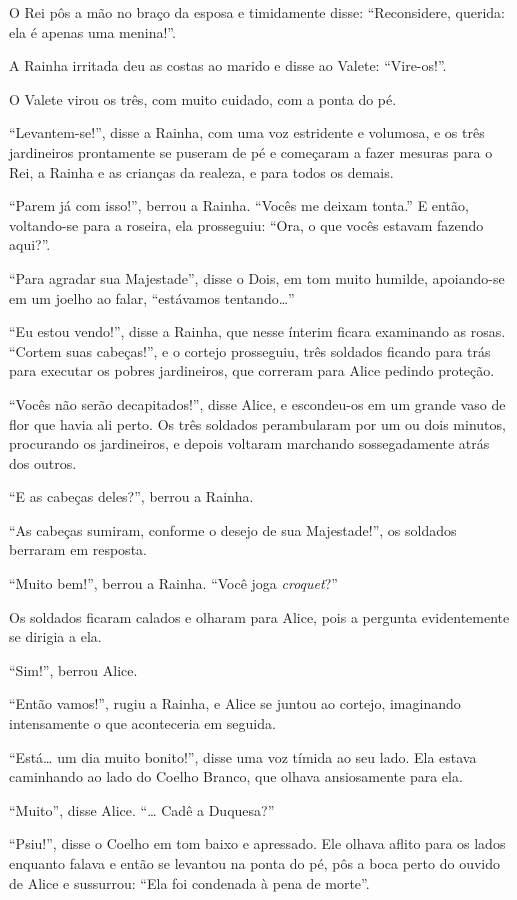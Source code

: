 O Rei pôs a mão no braço da esposa e timidamente disse: ``Reconsidere,
querida: ela é apenas uma menina!''.

A Rainha irritada deu as costas ao marido e disse ao Valete:
``Vire-os!''.

O Valete virou os três, com muito cuidado, com a ponta do pé.

``Levantem-se!'', disse a Rainha, com uma voz estridente e volumosa, e
os três jardineiros prontamente se puseram de pé e começaram a fazer
mesuras para o Rei, a Rainha e as crianças da realeza, e para
todos os demais.

``Parem já com isso!'', berrou a Rainha. ``Vocês me deixam tonta.'' E
então, voltando-se para a roseira, ela prosseguiu: ``Ora, o que vocês
estavam fazendo aqui?''.

``Para agradar sua Majestade'', disse o Dois, em tom muito humilde,
apoiando-se em um joelho ao falar, ``estávamos tentando\ldots{}''

``Eu estou vendo!'', disse a Rainha, que nesse ínterim ficara examinando
as rosas. ``Cortem suas cabeças!'', e o cortejo prosseguiu, três
soldados ficando para trás para executar os pobres jardineiros, que
correram para Alice pedindo proteção.

``Vocês não serão decapitados!'', disse Alice, e escondeu-os em um
grande vaso de flor que havia ali perto. Os três soldados perambularam
por um ou dois minutos, procurando os jardineiros, e depois voltaram
marchando sossegadamente atrás dos outros.

``E as cabeças deles?'', berrou a Rainha.

``As cabeças sumiram, conforme o desejo de sua Majestade!'', os soldados
berraram em resposta.

``Muito bem!'', berrou a Rainha. ``Você joga \textit{croquet}?''

Os soldados ficaram calados e olharam para Alice, pois a pergunta
evidentemente se dirigia a ela.

``Sim!'', berrou Alice.

``Então vamos!'', rugiu a Rainha, e Alice se juntou ao cortejo,
imaginando intensamente o que aconteceria em seguida.

``Está\ldots{} um dia muito bonito!'', disse uma voz tímida ao seu lado. Ela
estava caminhando ao lado do Coelho Branco, que olhava ansiosamente para
ela.

``Muito'', disse Alice. ``\ldots{} Cadê a Duquesa?''

``Psiu!'', disse o Coelho em tom baixo e apressado. Ele olhava aflito
para os lados enquanto falava e então se levantou na ponta do pé, pôs a
boca perto do ouvido de Alice e sussurrou: ``Ela foi condenada à pena
de morte''.


